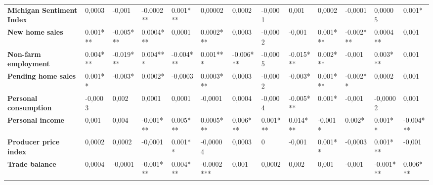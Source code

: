 \begin{landscape}
\begin{table}[]
{\begin{tabular}{@{}lllllllllllll@{}}
\textbf{Michigan Sentiment Index} & 0,0003             & -0,001            & -0.0002**         & 0.001***          & 0,00002           & 0,0002            & -0,0001             & 0,001              & 0,0002             & -0,0001           & 0,00005           & 0.001*            \\
\textbf{New home sales}           & 0.001***           & -0.005***         & 0.0004***         & 0,0001            & 0.0002***         & 0,0003            & -0,0002             & -0,001             & 0.001***           & -0.002***         & 0.0004**          & 0,001             \\
\textbf{Non-farm employment}      & 0.004***           & -0.019***         & 0.004***          & -0.004***         & 0.001***          & -0.006***         & -0,0005             & -0.015***          & 0.002***           & -0,001            & 0.003***          & 0,001             \\
\textbf{Pending home sales}       & 0.001**            & -0.003*           & 0.0002*           & -0,0003           & 0.0003***         & 0,0003            & -0,0002             & -0.003*            & 0.001***           & -0.002**          & 0,0002            & 0,001             \\
\textbf{Personal consumption}     & -0,0003            & 0,002             & 0,0001            & 0,0001            & -0,0001           & 0,0004            & -0,0004             & -0.005***          & 0.001*             & -0,001            & -0,00002          & 0,001             \\
\textbf{Personal income}          & 0,001              & 0,004             & -0.001***         & 0.005***          & 0.0005***         & 0.006***          & 0.001***            & 0.014***           & -0.001*            & 0.002*            & 0.001**           & -0.004***         \\
\textbf{Producer price index}     & 0,0002             & 0,0002            & -0,0001           & 0.001**           & -0,00004          & 0,0003            & 0                   & -0,001             & 0.001**            & -0,0003           & 0.001***          & -0,001            \\
\textbf{Trade balance}            & 0,0004             & -0,0001           & -0.001***         & 0.004***          & -0.0002***        & 0,001             & 0,0002              & 0,002              & 0,001              & -0,001            & -0.001***         & 0.006***          \\ \bottomrule
\end{tabular}%
}


\end{table}
\end{landscape}
